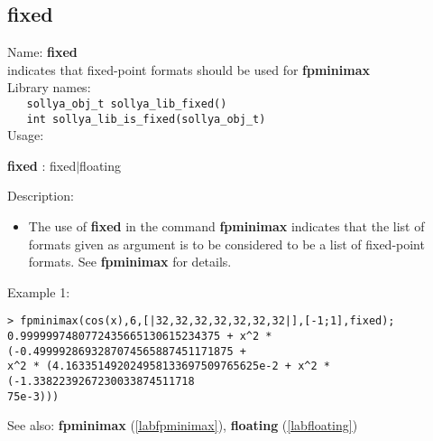 \subsection{fixed}
\label{labfixed}
\noindent Name: \textbf{fixed}\\
\phantom{aaa}indicates that fixed-point formats should be used for \textbf{fpminimax}\\[0.2cm]
\noindent Library names:\\
\verb|   sollya_obj_t sollya_lib_fixed()|\\
\verb|   int sollya_lib_is_fixed(sollya_obj_t)|\\[0.2cm]
\noindent Usage: 
\begin{center}
\textbf{fixed} : \textsf{fixed$|$floating}\\
\end{center}
\noindent Description: \begin{itemize}

\item The use of \textbf{fixed} in the command \textbf{fpminimax} indicates that the list of
   formats given as argument is to be considered to be a list of fixed-point
   formats.
   See \textbf{fpminimax} for details.
\end{itemize}
\noindent Example 1: 
\begin{center}\begin{minipage}{15cm}\begin{Verbatim}[frame=single]
> fpminimax(cos(x),6,[|32,32,32,32,32,32,32|],[-1;1],fixed);
0.9999997480772435665130615234375 + x^2 * (-0.4999928693287074565887451171875 + 
x^2 * (4.163351492024958133697509765625e-2 + x^2 * (-1.3382239267230033874511718
75e-3)))
\end{Verbatim}
\end{minipage}\end{center}
See also: \textbf{fpminimax} (\ref{labfpminimax}), \textbf{floating} (\ref{labfloating})
